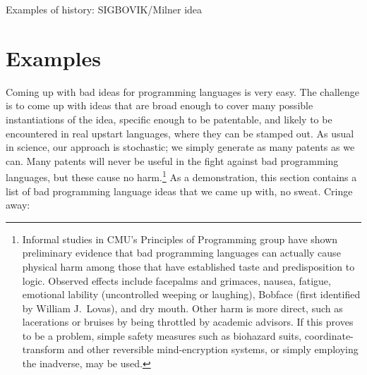 \documentclass[acmtocl]%
{boviktrans}
\begin{document}
Examples of history: SIGBOVIK/Milner idea


\section{Examples}


Coming up with bad ideas for programming languages is very easy. The
challenge is to come up with ideas that are broad enough to cover many
possible instantiations of the idea, specific enough to be patentable,
and likely to be encountered in real upstart languages, where they can
be stamped out. As usual in science, our approach is stochastic; we
simply generate as many patents as we can. Many patents will never be
useful in the fight against bad programming languages, but these cause
no harm.\!\footnote{Informal studies in CMU's Principles of
  Programming group have shown preliminary evidence that bad
  programming languages can actually cause physical harm among those
  that have established taste and predisposition to logic. Observed
  effects include facepalms and grimaces, nausea, fatigue, emotional
  lability (uncontrolled weeping or laughing), Bobface (first identified
  by William J.~Lovas), and dry mouth. Other harm is more direct, such
  as lacerations or bruises by being throttled by academic advisors.
  If this proves to be a problem, simple safety measures such as biohazard
  suits, coordinate-transform and other reversible mind-encryption systems,
  or simply employing the inadverse, may be used.}
As a demonstration, this section contains a list of bad programming language
ideas that we came up with, no sweat. Cringe away:
\end{document}
